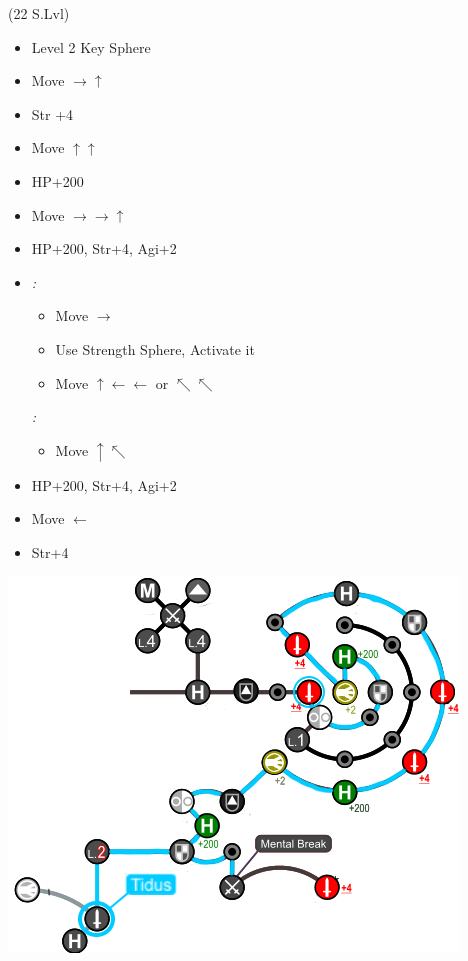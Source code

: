 \begin{spheregrid}
	\begin{itemize}
		\tidusf (22 S.Lvl)
		\begin{itemize}
			\item Level 2 Key Sphere
			\item Move $\rightarrow\uparrow$
			\item Str +4
			\item Move $\uparrow\uparrow$
			\item HP+200
			\item Move $\rightarrow\rightarrow\uparrow$
			\item HP+200, Str+4, Agi+2
			\item \textit{\blitzwin:}
			      \begin{itemize}
				      \item Move $\rightarrow$
				      \item Use Strength Sphere, Activate it
				      \item Move $\uparrow\leftarrow\leftarrow$ or $\nwarrow\nwarrow$
			      \end{itemize}
			      \textit{\blitzloss:}
			      \begin{itemize}
				      \item Move $\uparrow\nwarrow$
			      \end{itemize}
			\item HP+200, Str+4, Agi+2
			\item Move $\leftarrow$
			\item Str+4
		\end{itemize}
		\includegraphics{graphics/Tidus_post_crawler}
	\end{itemize}
\end{spheregrid}
